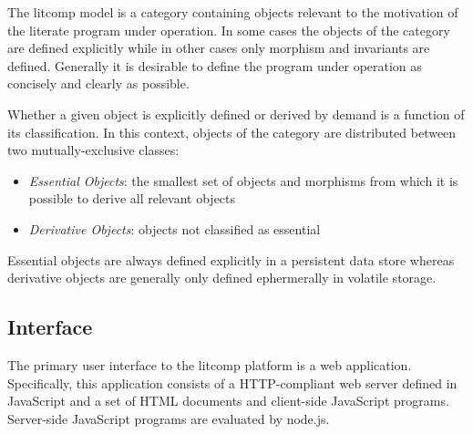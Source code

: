 The litcomp model is a category containing objects relevant to
the motivation of the literate program under operation. In some cases
the objects of the category are defined explicitly while in other cases
only morphism and invariants are defined. Generally it is desirable to
define the program under operation as concisely and clearly as possible.

Whether a given object is explicitly defined or derived by demand is a
function of its classification. In this context, objects of the category
are distributed between two mutually-exclusive classes:

\begin{itemize}

\item {\em Essential Objects}: the smallest set of objects and morphisms
from which it is possible to derive all relevant objects

\item {\em Derivative Objects}: objects not classified as essential

\end{itemize}

Essential objects are always defined explicitly in a persistent data
store whereas derivative objects are generally only defined ephermerally
in volatile storage.

\pagebreak

\subsection {Interface}

The primary user interface to the litcomp platform is a web
application. Specifically, this application consists of a HTTP-compliant
web server defined in JavaScript and a set of HTML documents and
client-side JavaScript programs. Server-side JavaScript programs are
evaluated by node.js.


